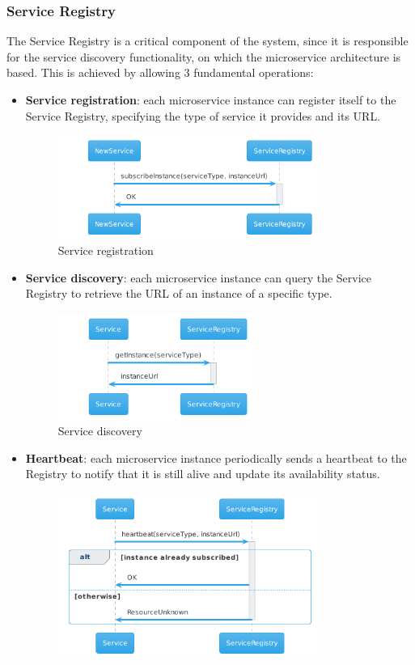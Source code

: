 \subsubsection{Service Registry}
The Service Registry is a critical component of the system, since it is responsible for the service discovery functionality, on which the microservice architecture is based. This is achieved by allowing 3 fundamental operations:
\begin{itemize}
    \item \textbf{Service registration}: each microservice instance can register itself to the Service Registry, specifying the type of service it provides and its URL.
    \begin{figure}[H]
        \centering
        \includegraphics[width=0.8\textwidth]{Diagrams/sequence/service_registration.png}
        \caption{Service registration}
    \end{figure}
    \item \textbf{Service discovery}: each microservice instance can query the Service Registry to retrieve the URL of an instance of a specific type.
    \begin{figure}[H]
        \centering
        \includegraphics[width=0.6\textwidth]{Diagrams/sequence/service_discovery.png}
        \caption{Service discovery}
    \end{figure}
    \item \textbf{Heartbeat}: each microservice instance periodically sends a heartbeat to the Registry to notify that it is still alive and update its availability status.
    \begin{figure}[H]
        \centering
        \includegraphics[width=0.8\textwidth]{Diagrams/sequence/service_heartbeat.png}

\end{figure}
\end{itemize}
